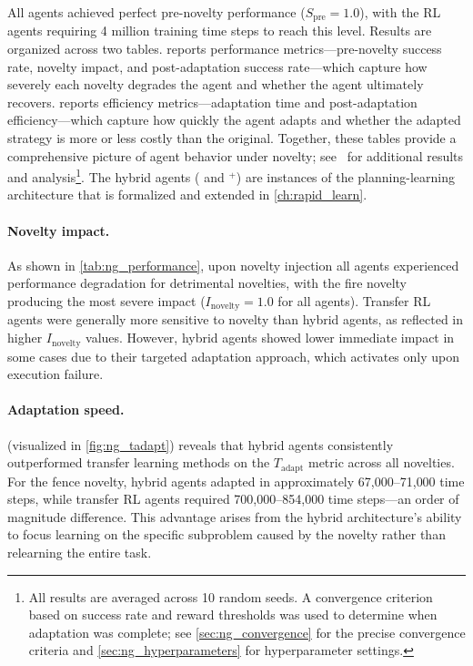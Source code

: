 All agents achieved perfect pre-novelty performance ($S_\text{pre} = 1.0$), with the RL agents requiring 4 million training time steps to reach this level. Results are organized across two tables.  reports performance metrics---pre-novelty success rate, novelty impact, and post-adaptation success rate---which capture how severely each novelty degrades the agent and whether the agent ultimately recovers.  reports efficiency metrics---adaptation time and post-adaptation efficiency---which capture how quickly the agent adapts and whether the adapted strategy is more or less costly than the original. Together, these tables provide a comprehensive picture of agent behavior under novelty; see~\citet{goel2024novelgym} for additional results and analysis\footnote{All results are averaged across 10 random seeds. A convergence criterion based on success rate and reward thresholds was used to determine when adaptation was complete; see \cref{sec:ng_convergence} for the precise convergence criteria and \cref{sec:ng_hyperparameters} for hyperparameter settings.}. The hybrid agents (\RAPidLearn{} and \RAPidLearn{}$^+$) are instances of the planning-learning architecture that is formalized and extended in \cref{ch:rapid_learn}.










\paragraph{Novelty impact.} As shown in \cref{tab:ng_performance}, upon novelty injection all agents experienced performance degradation for detrimental novelties, with the fire novelty producing the most severe impact ($I_\text{novelty} = 1.0$ for all agents). Transfer RL agents were generally more sensitive to novelty than hybrid agents, as reflected in higher $I_\text{novelty}$ values. However, hybrid agents showed lower immediate impact in some cases due to their targeted adaptation approach, which activates only upon execution failure.

\paragraph{Adaptation speed.}  (visualized in \cref{fig:ng_tadapt}) reveals that hybrid agents consistently outperformed transfer learning methods on the $T_\text{adapt}$ metric across all novelties. For the fence novelty, hybrid agents adapted in approximately 67{,}000--71{,}000 time steps, while transfer RL agents required 700{,}000--854{,}000 time steps---an order of magnitude difference. This advantage arises from the hybrid architecture's ability to focus learning on the specific subproblem caused by the novelty rather than relearning the entire task.

